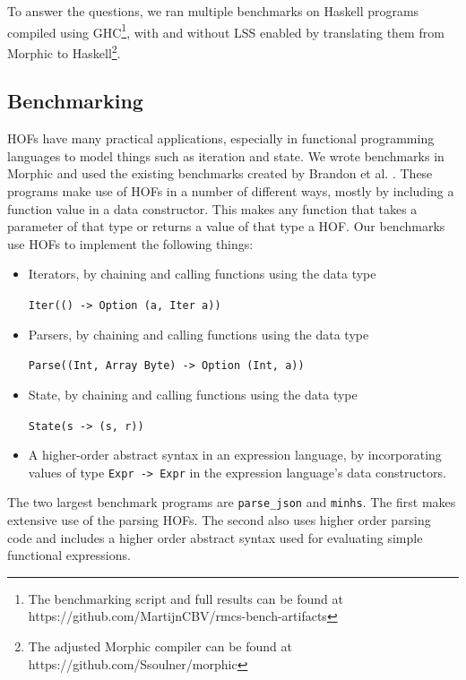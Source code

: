 \documentclass[a4paper,UKenglish,cleveref, autoref, thm-restate]{template/lipics-v2021}
\newcommand{\hof}{HOF\xspace}
\newcommand{\hofs}{HOFs\xspace}
\newcommand{\lss}{LSS\xspace}
\newcommand{\ghc}{GHC\xspace}
\begin{document}
To answer the questions, we ran multiple benchmarks on Haskell programs compiled using \ghc\footnote{The benchmarking script and full results can be found at https://github.com/MartijnCBV/rmcs-bench-artifacts}, with and without \lss enabled by translating them from Morphic to Haskell\footnote{The adjusted Morphic compiler can be found at https://github.com/Ssoulner/morphic}.

\subsection{Benchmarking}\label{sec:bench}
\hofs have many practical applications, especially in functional programming languages to model things such as iteration and state. We wrote benchmarks in Morphic and used the existing benchmarks created by Brandon et al. \cite{brandon2023better}. These programs make use of \hofs in a number of different ways, mostly by including a function value in a data constructor. This makes any function that takes a parameter of that type or returns a value of that type a \hof. Our benchmarks use \hofs to implement the following things:
\begin{itemize}
  \item Iterators, by chaining and calling functions using the data type
        \begin{center}
          \verb|Iter(() -> Option (a, Iter a))|
        \end{center}
  \item Parsers, by chaining and calling functions using the data type
        \begin{center}
          \verb|Parse((Int, Array Byte) -> Option (Int, a))|
        \end{center}
  \item State, by chaining and calling functions using the data type
        \begin{center}
          \verb|State(s -> (s, r))|
        \end{center}
  \item A higher-order abstract syntax in an expression language, by incorporating values of type \verb|Expr -> Expr| in the expression language's data constructors.
\end{itemize}
The two largest benchmark programs are \verb|parse_json| and \verb|minhs|. The first makes extensive use of the parsing \hofs. The second also uses higher order parsing code and includes a higher order abstract syntax used for evaluating simple functional expressions.
\end{document}
